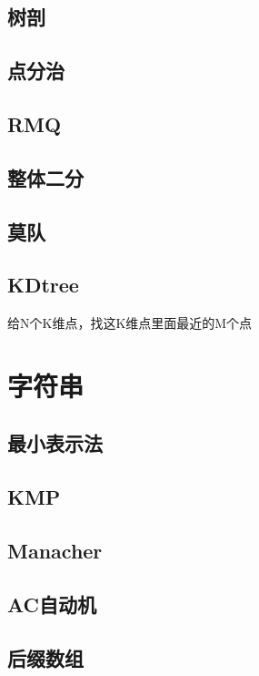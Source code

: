 \documentclass{report}
\begin{document}
    \section{树剖}
        
    \section{点分治}
        
    \section{RMQ}
        
    \section{整体二分}
        
    \section{莫队}
        
    \section{KDtree}
        给N个K维点，找这K维点里面最近的M个点
        
\chapter{字符串}
    \section{最小表示法}
        
    \section{KMP}
        
    \section{Manacher}
        
    \section{AC自动机}
        
    \section{后缀数组}
        
\end{document}
